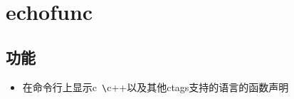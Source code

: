 \chapter{echofunc}

\section{功能}
\begin{itemize}
    \item 在命令行上显示c~\verb|\|c++以及其他ctags支持的语言的函数声明
\end{itemize}

\newpage

